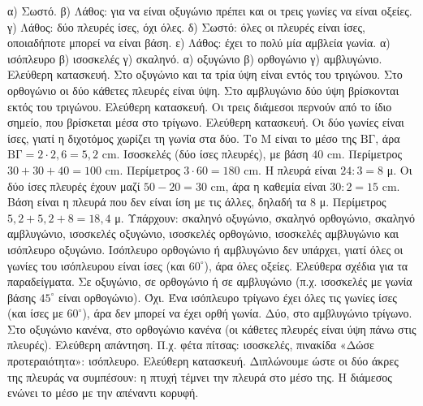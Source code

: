  α) Σωστό. β) Λάθος: για να είναι οξυγώνιο πρέπει και οι τρεις γωνίες να είναι οξείες. γ) Λάθος: δύο πλευρές ίσες, όχι όλες. δ) Σωστό: όλες οι πλευρές είναι ίσες, οποιαδήποτε μπορεί να είναι βάση. ε) Λάθος: έχει το πολύ μία αμβλεία γωνία.
 α) ισόπλευρο \quad β) ισοσκελές \quad γ) σκαληνό.
 α) οξυγώνιο \quad β) ορθογώνιο \quad γ) αμβλυγώνιο.
 Ελεύθερη κατασκευή. Στο οξυγώνιο και τα τρία ύψη είναι εντός του τριγώνου. Στο ορθογώνιο οι δύο κάθετες πλευρές είναι ύψη. Στο αμβλυγώνιο δύο ύψη βρίσκονται εκτός του τριγώνου.
 Ελεύθερη κατασκευή. Οι τρεις διάμεσοι περνούν από το ίδιο σημείο, που βρίσκεται μέσα στο τρίγωνο.
 Ελεύθερη κατασκευή. Οι δύο γωνίες είναι ίσες, γιατί η διχοτόμος χωρίζει τη γωνία στα δύο.
 Το $\mathrm{Μ}$ είναι το μέσο της $\mathrm{ΒΓ}$, άρα $\mathrm{ΒΓ}=2\cdot2{,}6=5{,}2$ cm.
 Ισοσκελές (δύο ίσες πλευρές), με βάση $40$ cm. Περίμετρος $30+30+40=100$ cm.
 Περίμετρος $3\cdot60=180$ cm.
 Η πλευρά είναι $24:3=8$ μ.
 Οι δύο ίσες πλευρές έχουν μαζί $50-20=30$ cm, άρα η καθεμία είναι $30:2=15$ cm.
 Βάση είναι η πλευρά που δεν είναι ίση με τις άλλες, δηλαδή τα $8$ μ. Περίμετρος $5{,}2+5{,}2+8=18{,}4$ μ.
 Υπάρχουν: σκαληνό οξυγώνιο, σκαληνό ορθογώνιο, σκαληνό αμβλυγώνιο, ισοσκελές οξυγώνιο, ισοσκελές ορθογώνιο, ισοσκελές αμβλυγώνιο και ισόπλευρο οξυγώνιο. Ισόπλευρο ορθογώνιο ή αμβλυγώνιο δεν υπάρχει, γιατί όλες οι γωνίες του ισόπλευρου είναι ίσες (και $60^\circ$), άρα όλες οξείες. Ελεύθερα σχέδια για τα παραδείγματα.
 Σε οξυγώνιο, σε ορθογώνιο ή σε αμβλυγώνιο (π.χ. ισοσκελές με γωνία βάσης $45^\circ$ είναι ορθογώνιο).
 Όχι. Ένα ισόπλευρο τρίγωνο έχει όλες τις γωνίες ίσες (και ίσες με $60^\circ$), άρα δεν μπορεί να έχει ορθή γωνία.
 Δύο, στο αμβλυγώνιο τρίγωνο. Στο οξυγώνιο κανένα, στο ορθογώνιο κανένα (οι κάθετες πλευρές είναι ύψη πάνω στις πλευρές).
 Ελεύθερη απάντηση. Π.χ. φέτα πίτσας: ισοσκελές, πινακίδα «Δώσε προτεραιότητα»: ισόπλευρο.
 Ελεύθερη κατασκευή. Διπλώνουμε ώστε οι δύο άκρες της πλευράς να συμπέσουν: η πτυχή τέμνει την πλευρά στο μέσο της. Η διάμεσος ενώνει το μέσο με την απέναντι κορυφή.
